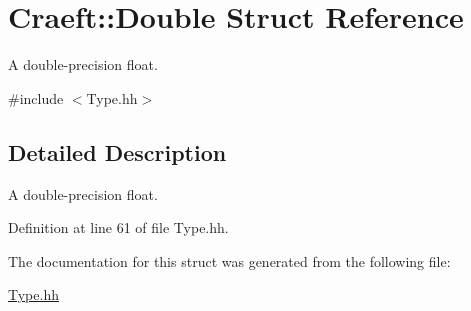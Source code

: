 \hypertarget{struct_craeft_1_1_double}{}\section{Craeft\+:\+:Double Struct Reference}
\label{struct_craeft_1_1_double}


A double-\/precision float.  




{\ttfamily \#include $<$Type.\+hh$>$}



\subsection{Detailed Description}
A double-\/precision float. 

Definition at line 61 of file Type.\+hh.



The documentation for this struct was generated from the following file\+:\begin{DoxyCompactItemize}
\item 
\hyperlink{_type_8hh}{Type.\+hh}\end{DoxyCompactItemize}
